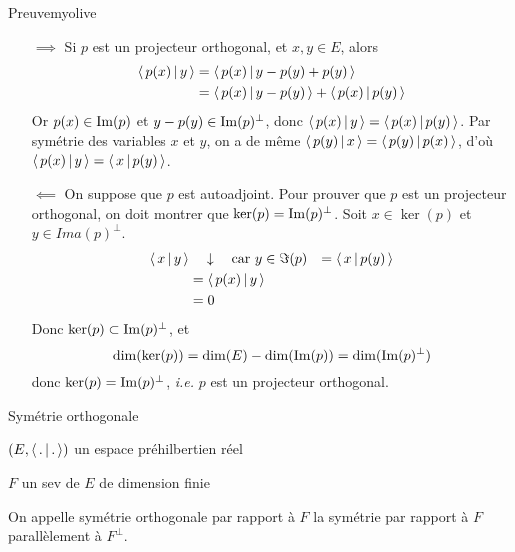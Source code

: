         \begin{demo}{Preuve}{myolive}
            \begin{itemize}
                \item[$\implies$] Si $p$ est un projecteur orthogonal, et $x,y \in E$, alors 
                \begin{align*}
                    \left<\,p(x)\,\middle|\,y\,\right> 
                    &= \left<\,p(x)\,\middle|\,y - p(y) + p(y)\,\right> \\
                    &= \left<\,p(x)\,\middle|\,y - p(y)\,\right> + \left<\,p(x)\,\middle|\,p(y)\,\right> \\
                \end{align*}
                Or $p(x) \in \operatorname{Im}(p)$ et $y - p(y) \in \operatorname{Im}(p)^{\perp}$, donc $\left<\,p(x)\,\middle|\,y\,\right> = \left<\,p(x)\,\middle|\,p(y)\,\right>$. Par symétrie des variables $x$ et $y$, on a de même $\left<\,p(y)\,\middle|\,x\,\right> = \left<\,p(y)\,\middle|\,p(x)\,\right>$, d’où $\left<\,p(x)\,\middle|\,y\,\right> = \left<\,x\,\middle|\,p(y)\,\right>$.
                \item[$\impliedby$] On suppose que $p$ est autoadjoint. Pour prouver que $p$ est un projecteur orthogonal, on doit montrer que $\ker(p) = \operatorname{Im}(p)^{\perp}$. Soit $x \in \ker(p)$ et $y \in Ima(p)^{\perp}$. 
                \begin{align*}
                    \left<\,x\,\middle|\,y\,\right> 
                    & \quad \downarrow \quad \text{car } y \in \Im(p)
                    &= \left<\,x\,\middle|\,p(y)\,\right> \\
                    &= \left<\,p(x)\,\middle|\,y\,\right> \\
                    &= 0
                \end{align*}
                Donc $\ker(p) \subset \operatorname{Im}(p)^{\perp}$, et 
                \[ \dim(\ker(p)) = \dim(E) - \dim(\operatorname{Im}(p)) = \dim(\operatorname{Im}(p)^{\perp}) \]   donc $\ker(p) = \operatorname{Im}(p)^{\perp}$, \textit{i.e.} $p$ est un projecteur orthogonal.
            \end{itemize}
        \end{demo}

        \begin{defi}{Symétrie orthogonale}{}
            \begin{soient}
                \item $(E,\left<\,.\,\middle|\,.\,\right>)$ un espace préhilbertien réel
                \item $F$ un sev de $E$ de dimension finie
            \end{soient}
            On appelle symétrie orthogonale par rapport à $F$ la symétrie par rapport à $F$ parallèlement à $F^{\perp}$.
        \end{defi}

